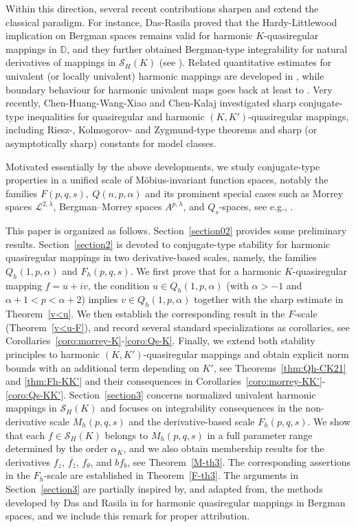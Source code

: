 \documentclass[12pt, reqno]{amsart}
\begin{document}
Within this direction, several recent contributions sharpen and extend the classical paradigm.
For instance, Das-Rasila \cite{DR} proved that the Hardy-Littlewood implication on Bergman spaces remains valid
for harmonic $K$-quasiregular mappings in $\mathbb D$, and they further obtained Bergman-type integrability
for natural derivatives of mappings in $\mathcal S_H(K)$ (see \cite{DRN,LZ}).
Related quantitative estimates for univalent (or locally univalent) harmonic mappings are developed in \cite{DSK},
while boundary behaviour for harmonic univalent maps goes back at least to \cite{AML}.
Very recently, Chen-Huang-Wang-Xiao \cite{CHWX} and Chen-Kalaj \cite{CK} investigated sharp conjugate-type
inequalities for quasiregular and harmonic $(K,K')$-quasiregular mappings, including Riesz-, Kolmogorov-
and Zygmund-type theorems and sharp (or asymptotically sharp) constants for model classes.

Motivated essentially by the above developments, we study conjugate-type properties in a unified scale of Möbius-invariant
function spaces, notably the families $F(p,q,s),~Q(n,p,\alpha)$ and its prominent special cases such as Morrey spaces $\mathcal{L}^{2,\lambda}$,
Bergman--Morrey spaces $A^{p,\lambda}$, and $Q_s$-spaces, see e.g., \cite{LL,WJ,XJ1,XJ2,YL,ZR,ZR1,ZK,ZK1,z2}.

This paper is organized as follows. Section~\ref{section02} provides some preliminary results.
Section~\ref{section2} is devoted to conjugate-type stability for harmonic quasiregular mappings in two derivative-based scales, namely, the families $Q_h(1,p,\alpha)$ and $F_h(p,q,s)$.
We first prove that for a harmonic $K$-quasiregular mapping $f=u+iv$, the condition $u\in Q_h(1,p,\alpha)$ (with $\alpha>-1$ and $\alpha+1<p<\alpha+2$) implies $v\in Q_h(1,p,\alpha)$ together with the sharp estimate in Theorem~\ref{v<u}.
We then establish the corresponding result in the $F$-scale (Theorem~\ref{v<u-F}), and record several standard specializations as corollaries, see Corollaries~\ref{coro:morrey-K}-\ref{coro:Qs-K}.
Finally, we extend both stability principles to harmonic $(K,K')$-quasiregular mappings and obtain explicit norm bounds with an additional term depending on $K'$, see Theorems~\ref{thm:Qh-CK21} and \ref{thm:Fh-KK'} and their consequences in Corollaries~\ref{coro:morrey-KK'}-\ref{coro:Qs-KK'}.
Section~\ref{section3} concerns normalized univalent harmonic mappings in $\mathcal S_H(K)$ and focuses on integrability consequences in the non-derivative scale $M_h(p,q,s)$ and the derivative-based scale $F_h(p,q,s)$.
We show that each $f\in\mathcal S_H(K)$ belongs to $M_h(p,q,s)$ in a full parameter range determined by the order $\alpha_K$, and we also obtain membership results for the derivatives $f_z$, $\overline{f_{\bar z}}$, $f_\theta$, and $b f_b$, see Theorem~\ref{M-th3}.
The corresponding assertions in the $F_h$-scale are established in Theorem~\ref{F-th3}. The arguments in Section~\ref{section3} are partially inspired by, and adapted from,
the methods developed by Das and Rasila in \cite{DR} for harmonic quasiregular mappings in Bergman spaces,
and we include this remark for proper attribution.
\end{document}
